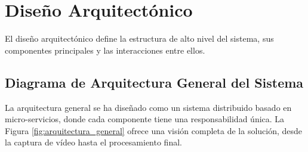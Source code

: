\section{Diseño Arquitectónico}
\label{sec:diseno_arquitectonico}
El diseño arquitectónico define la estructura de alto nivel del sistema, sus componentes principales y las interacciones entre ellos.

\subsection{Diagrama de Arquitectura General del Sistema}
La arquitectura general se ha diseñado como un sistema distribuido basado en micro-servicios, donde cada componente tiene una responsabilidad única. La Figura \ref{fig:arquitectura_general} ofrece una visión completa de la solución, desde la captura de vídeo hasta el procesamiento final.

